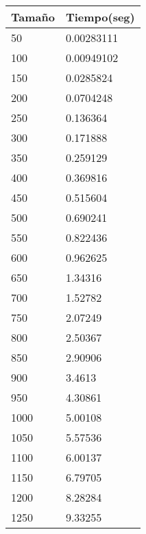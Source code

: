 \begin{longtable}{|l|l|}
\hline
\textbf{Tamaño} & \textbf{Tiempo(seg)} \\ \hline
50     & 0.00283111  \\ \hline
100    & 0.00949102  \\ \hline
150    & 0.0285824   \\ \hline
200    & 0.0704248   \\ \hline
250    & 0.136364    \\ \hline
300    & 0.171888    \\ \hline
350    & 0.259129    \\ \hline
400    & 0.369816    \\ \hline
450    & 0.515604    \\ \hline
500    & 0.690241    \\ \hline
550    & 0.822436    \\ \hline
600    & 0.962625    \\ \hline
650    & 1.34316     \\ \hline
700    & 1.52782     \\ \hline
750    & 2.07249     \\ \hline
800    & 2.50367     \\ \hline
850    & 2.90906     \\ \hline
900    & 3.4613      \\ \hline
950    & 4.30861     \\ \hline
1000   & 5.00108     \\ \hline
1050   & 5.57536     \\ \hline
1100   & 6.00137     \\ \hline
1150   & 6.79705     \\ \hline
1200   & 8.28284     \\ \hline
1250   & 9.33255     \\ \hline
\end{longtable}
